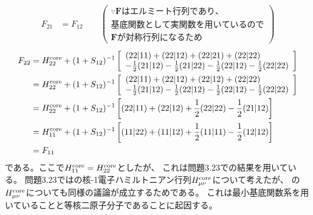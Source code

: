 \begin{align}
	F_{21}
&=
	F_{12}
	\qquad
	\left(
	\begin{array}{l}
		\because \bm{F}はエルミート行列であり、 \\
		基底関数として実関数を用いているので \\
		\bm{F}が対称行列になるため
	\end{array}
	\right)
\end{align}
\begin{align}
	F_{22}
&=
	H^{\rm core}_{22}
	+
	(1+S_{12})^{-1}
	\left[
	\begin{array}{l}
		\spacetwo{22}{11}
		+
		\spacetwo{22}{12}
		+
		\spacetwo{22}{21}
		+
		\spacetwo{22}{22} \\
		-
		\frac{1}{2}
		\spacetwo{21}{12}
		-
		\frac{1}{2}
		\spacetwo{21}{22}
		-
		\frac{1}{2}
		\spacetwo{22}{12}
		-
		\frac{1}{2}
		\spacetwo{22}{22}
	\end{array}
	\right] \\
%
%
&=
	H^{\rm core}_{22}
	+
	(1+S_{12})^{-1}
	\left[
	\begin{array}{l}
		\spacetwo{22}{11}
		+
		\spacetwo{22}{12}
		+
		\spacetwo{22}{12}
		+
		\spacetwo{22}{22} \\
		-
		\frac{1}{2}
		\spacetwo{21}{12}
		-
		\frac{1}{2}
		\spacetwo{22}{12}
		-
		\frac{1}{2}
		\spacetwo{22}{12}
		-
		\frac{1}{2}
		\spacetwo{22}{22}
	\end{array}
	\right] \\
%
%
&=
	H^{\rm core}_{22}
	+
	(1+S_{12})^{-1}
	\left[
		\spacetwo{22}{11}
		+
		\spacetwo{22}{12}
		+
		\frac{1}{2}
		\spacetwo{22}{22}
		-
		\frac{1}{2}
		\spacetwo{21}{12}
	\right] \\
%
%
&=
	H^{\rm core}_{11}
	+
	(1+S_{12})^{-1}
	\left[
		\spacetwo{11}{22}
		+
		\spacetwo{11}{12}
		+
		\frac{1}{2}
		\spacetwo{11}{11}
		-
		\frac{1}{2}
		\spacetwo{12}{12}
	\right] \\
&=
	F_{11}
\end{align}
である。ここで$H^{\rm core}_{11}=H^{\rm core}_{22}$としたが、
これは問題3.23での結果を用いている。
問題3.23ではの核-1電子ハミルトニアン行列$H^{\rm core}_{\mu\nu}$について考えたが、
の$H^{\rm core}_{\mu\nu}$についても同様の議論が成立するためである。
これは最小基底関数系を用いていることと等核二原子分子であることに起因する。

